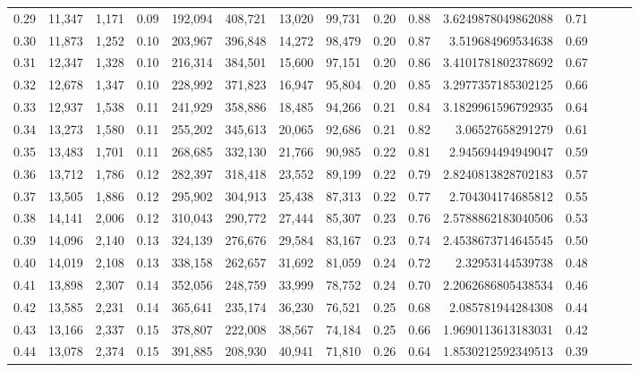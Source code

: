 \begin{tabular}{rrrrrrrrrrrrrrr}
0.29 &  11,347 &  1,171 &  0.09 &  192,094 &  408,721 &   13,020 &   99,731 &  0.20 &  0.88 &    3.6249878049862088 &      0.71 \\
0.30 &  11,873 &  1,252 &  0.10 &  203,967 &  396,848 &   14,272 &   98,479 &  0.20 &  0.87 &     3.519684969534638 &      0.69 \\
0.31 &  12,347 &  1,328 &  0.10 &  216,314 &  384,501 &   15,600 &   97,151 &  0.20 &  0.86 &    3.4101781802378692 &      0.67 \\
0.32 &  12,678 &  1,347 &  0.10 &  228,992 &  371,823 &   16,947 &   95,804 &  0.20 &  0.85 &    3.2977357185302125 &      0.66 \\
0.33 &  12,937 &  1,538 &  0.11 &  241,929 &  358,886 &   18,485 &   94,266 &  0.21 &  0.84 &    3.1829961596792935 &      0.64 \\
0.34 &  13,273 &  1,580 &  0.11 &  255,202 &  345,613 &   20,065 &   92,686 &  0.21 &  0.82 &      3.06527658291279 &      0.61 \\
0.35 &  13,483 &  1,701 &  0.11 &  268,685 &  332,130 &   21,766 &   90,985 &  0.22 &  0.81 &     2.945694494949047 &      0.59 \\
0.36 &  13,712 &  1,786 &  0.12 &  282,397 &  318,418 &   23,552 &   89,199 &  0.22 &  0.79 &    2.8240813828702183 &      0.57 \\
0.37 &  13,505 &  1,886 &  0.12 &  295,902 &  304,913 &   25,438 &   87,313 &  0.22 &  0.77 &     2.704304174685812 &      0.55 \\
0.38 &  14,141 &  2,006 &  0.12 &  310,043 &  290,772 &   27,444 &   85,307 &  0.23 &  0.76 &    2.5788862183040506 &      0.53 \\
0.39 &  14,096 &  2,140 &  0.13 &  324,139 &  276,676 &   29,584 &   83,167 &  0.23 &  0.74 &    2.4538673714645545 &      0.50 \\
0.40 &  14,019 &  2,108 &  0.13 &  338,158 &  262,657 &   31,692 &   81,059 &  0.24 &  0.72 &      2.32953144539738 &      0.48 \\
0.41 &  13,898 &  2,307 &  0.14 &  352,056 &  248,759 &   33,999 &   78,752 &  0.24 &  0.70 &    2.2062686805438534 &      0.46 \\
0.42 &  13,585 &  2,231 &  0.14 &  365,641 &  235,174 &   36,230 &   76,521 &  0.25 &  0.68 &     2.085781944284308 &      0.44 \\
0.43 &  13,166 &  2,337 &  0.15 &  378,807 &  222,008 &   38,567 &   74,184 &  0.25 &  0.66 &    1.9690113613183031 &      0.42 \\
0.44 &  13,078 &  2,374 &  0.15 &  391,885 &  208,930 &   40,941 &   71,810 &  0.26 &  0.64 &    1.8530212592349513 &      0.39 \\

\end{tabular}
